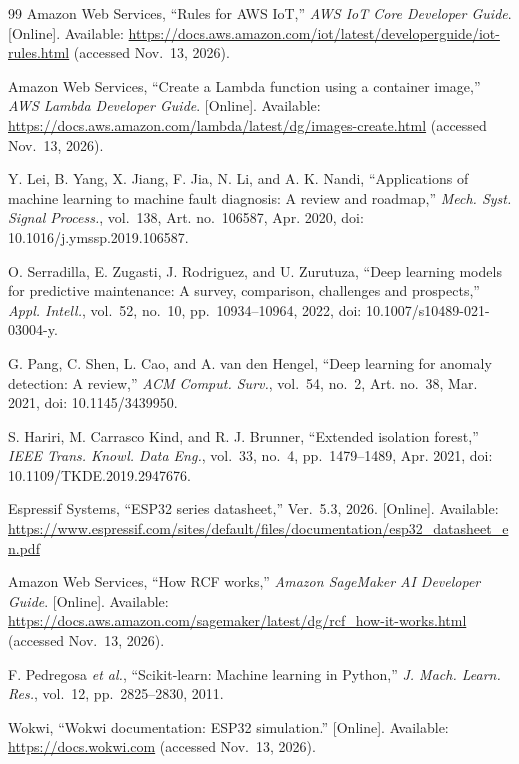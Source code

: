\documentclass[10pt,twocolumn]{article}
\begin{document}
\begin{thebibliography}{99}
Amazon Web Services, ``Rules for AWS IoT,'' \emph{AWS IoT Core Developer Guide}. [Online].
Available: \url{https://docs.aws.amazon.com/iot/latest/developerguide/iot-rules.html}
(accessed Nov.~13, 2026).

Amazon Web Services, ``Create a Lambda function using a container image,'' \emph{AWS Lambda
Developer Guide}. [Online]. Available:
\url{https://docs.aws.amazon.com/lambda/latest/dg/images-create.html} (accessed Nov.~13, 2026).

Y. Lei, B. Yang, X. Jiang, F. Jia, N. Li, and A. K. Nandi, ``Applications of machine learning to
machine fault diagnosis: A review and roadmap,'' \emph{Mech. Syst. Signal Process.}, vol.~138,
Art. no.~106587, Apr. 2020, doi: 10.1016/j.ymssp.2019.106587.

O. Serradilla, E. Zugasti, J. Rodriguez, and U. Zurutuza, ``Deep learning models for predictive
maintenance: A survey, comparison, challenges and prospects,'' \emph{Appl. Intell.}, vol.~52,
no.~10, pp.~10934--10964, 2022, doi: 10.1007/s10489-021-03004-y.

G. Pang, C. Shen, L. Cao, and A. van den Hengel, ``Deep learning for anomaly detection: A
review,'' \emph{ACM Comput. Surv.}, vol.~54, no.~2, Art. no.~38, Mar. 2021,
doi: 10.1145/3439950.

S. Hariri, M. Carrasco Kind, and R. J. Brunner, ``Extended isolation forest,'' \emph{IEEE Trans.
Knowl. Data Eng.}, vol.~33, no.~4, pp.~1479--1489, Apr. 2021, doi: 10.1109/TKDE.2019.2947676.

Espressif Systems, ``ESP32 series datasheet,'' Ver.~5.3, 2026. [Online]. Available:
\url{https://www.espressif.com/sites/default/files/documentation/esp32_datasheet_en.pdf}

Amazon Web Services, ``How RCF works,'' \emph{Amazon SageMaker AI Developer Guide}. [Online].
Available: \url{https://docs.aws.amazon.com/sagemaker/latest/dg/rcf_how-it-works.html}
(accessed Nov.~13, 2026).

F. Pedregosa \emph{et al.}, ``Scikit-learn: Machine learning in Python,'' \emph{J. Mach. Learn.
Res.}, vol.~12, pp.~2825--2830, 2011.

Wokwi, ``Wokwi documentation: ESP32 simulation.'' [Online]. Available:
\url{https://docs.wokwi.com} (accessed Nov.~13, 2026).

\end{thebibliography}
\end{document}
